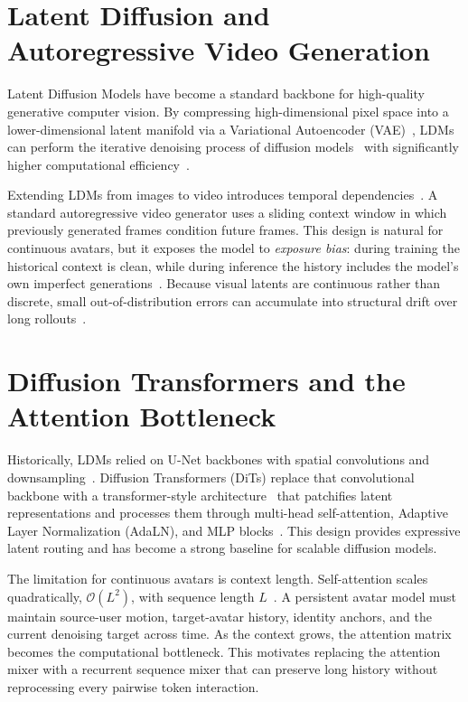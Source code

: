 \documentclass[12pt,letterpaper]{report}
\begin{document}
\section{Latent Diffusion and Autoregressive Video Generation}

Latent Diffusion Models have become a standard backbone for high-quality generative computer vision. By compressing high-dimensional pixel space into a lower-dimensional latent manifold via a Variational Autoencoder (VAE)~\cite{kingma2014autoencoding}, LDMs can perform the iterative denoising process of diffusion models~\cite{ho2020denoising} with significantly higher computational efficiency~\cite{rombach2022highresolution}.

Extending LDMs from images to video introduces temporal dependencies~\cite{blattmann2023align}. A standard autoregressive video generator uses a sliding context window in which previously generated frames condition future frames. This design is natural for continuous avatars, but it exposes the model to \textit{exposure bias}: during training the historical context is clean, while during inference the history includes the model's own imperfect generations~\cite{bengio2015scheduled}. Because visual latents are continuous rather than discrete, small out-of-distribution errors can accumulate into structural drift over long rollouts~\cite{statespacediffuser2025}.

\section{Diffusion Transformers and the Attention Bottleneck}

Historically, LDMs relied on U-Net backbones with spatial convolutions and downsampling~\cite{rombach2022highresolution}. Diffusion Transformers (DiTs) replace that convolutional backbone with a transformer-style architecture~\cite{vaswani2017attention} that patchifies latent representations and processes them through multi-head self-attention, Adaptive Layer Normalization (AdaLN), and MLP blocks~\cite{peebles2023scalable}. This design provides expressive latent routing and has become a strong baseline for scalable diffusion models.

The limitation for continuous avatars is context length. Self-attention scales quadratically, $\mathcal{O}(L^2)$, with sequence length $L$~\cite{peebles2023scalable}. A persistent avatar model must maintain source-user motion, target-avatar history, identity anchors, and the current denoising target across time. As the context grows, the attention matrix becomes the computational bottleneck. This motivates replacing the attention mixer with a recurrent sequence mixer that can preserve long history without reprocessing every pairwise token interaction.
\end{document}
